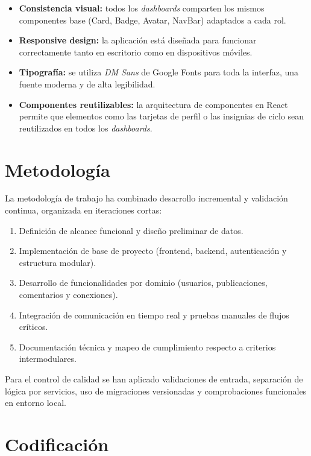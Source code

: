 \documentclass[12pt, a4paper]{report}
\begin{document}
\begin{itemize}
  \item \textbf{Consistencia visual:} todos los \emph{dashboards} comparten los mismos componentes
        base (Card, Badge, Avatar, NavBar) adaptados a cada rol.
  \item \textbf{Responsive design:} la aplicación está diseñada para funcionar correctamente tanto en
        escritorio como en dispositivos móviles.
  \item \textbf{Tipografía:} se utiliza \emph{DM Sans} de Google Fonts para toda la interfaz, una
        fuente moderna y de alta legibilidad.
  \item \textbf{Componentes reutilizables:} la arquitectura de componentes en React permite que
        elementos como las tarjetas de perfil o las insignias de ciclo sean reutilizados en todos los
        \emph{dashboards}.
\end{itemize}

\chapter{Metodología}

La metodología de trabajo ha combinado desarrollo incremental y validación continua, organizada en
iteraciones cortas:

\begin{enumerate}
  \item Definición de alcance funcional y diseño preliminar de datos.
  \item Implementación de base de proyecto (frontend, backend, autenticación y estructura modular).
  \item Desarrollo de funcionalidades por dominio (usuarios, publicaciones, comentarios y conexiones).
  \item Integración de comunicación en tiempo real y pruebas manuales de flujos críticos.
  \item Documentación técnica y mapeo de cumplimiento respecto a criterios intermodulares.
\end{enumerate}

Para el control de calidad se han aplicado validaciones de entrada, separación de lógica por servicios,
uso de migraciones versionadas y comprobaciones funcionales en entorno local.

\chapter{Codificación}
\end{document}
